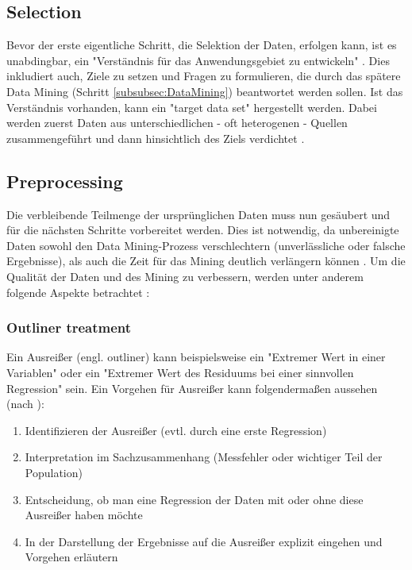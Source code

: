 \subsection{Selection}
Bevor der erste eigentliche Schritt, die Selektion der Daten, erfolgen kann, ist es unabdingbar, ein "Verständnis für das Anwendungsgebiet zu entwickeln" \citep[S.~42; eigene Übersetzung]{fayyad_data_1996}. Dies inkludiert auch, Ziele zu setzen und Fragen zu formulieren, die durch das spätere Data Mining (Schritt \ref{subsubsec:DataMining}) beantwortet werden sollen. Ist das Verständnis vorhanden, kann ein "target data set" \citep[S.~42]{fayyad_data_1996} hergestellt werden. Dabei werden zuerst Daten aus unterschiedlichen - oft heterogenen - Quellen zusammengeführt und dann hinsichtlich des Ziels verdichtet \citep[S.~70]{swamynathan_mastering_2017}.

\subsection{Preprocessing}
Die verbleibende Teilmenge der ursprünglichen Daten muss nun gesäubert und für die nächsten Schritte vorbereitet werden. Dies ist notwendig, da unbereinigte Daten sowohl den Data Mining-Prozess verschlechtern (unverlässliche oder falsche Ergebnisse), als auch die Zeit für das Mining deutlich verlängern können \citep[S.~70]{swamynathan_mastering_2017}.
Um die Qualität der Daten und des Mining zu verbessern, werden unter anderem folgende Aspekte betrachtet :

\subsubsection{Outliner treatment}
Ein Ausreißer (engl. outliner) kann beispielsweise ein "Extremer Wert in einer Variablen" oder ein "Extremer Wert des Residuums bei einer sinnvollen Regression" \citep[S.~25; Teil 5b]{hertle_datenanalyse_2016} sein. Ein Vorgehen für Ausreißer kann folgendermaßen aussehen (nach \citep[S.~25; Teil 5b]{hertle_datenanalyse_2016}):
\begin{enumerate}
\item Identifizieren der Ausreißer (evtl. durch eine erste Regression)
\item Interpretation im Sachzusammenhang (Messfehler oder wichtiger Teil der Population)
\item Entscheidung, ob man eine Regression der Daten mit oder ohne diese Ausreißer haben möchte
\item In der Darstellung der Ergebnisse auf die Ausreißer explizit eingehen und Vorgehen erläutern
\end{enumerate}

